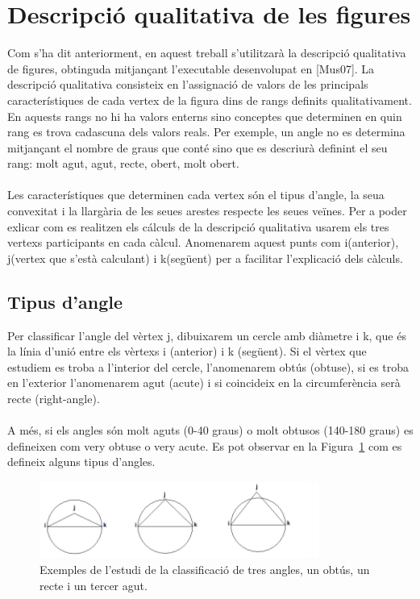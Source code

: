 \documentclass{article}
\begin{document}
\section{Descripció qualitativa de les figures}
Com s'ha dit anteriorment, en aquest treball s'utilitzarà la descripció qualitativa de figures, obtinguda mitjançant l'executable desenvolupat en [Mus07].
La descripció qualitativa consisteix en l'assignació de valors de les principals característiques de cada vertex de la figura dins de rangs definits qualitativament.
En aquests rangs no hi ha valors enterns sino conceptes que determinen en quin rang es trova cadascuna dels valors reals.
Per exemple, un angle no es determina mitjançant el nombre de graus que conté sino que es descriurà definint el seu rang: molt agut, agut, recte, obert, molt obert.
\\
\\
Les característiques que determinen cada vertex són el tipus d'angle, la seua convexitat i la llargària de les seues arestes respecte les seues veïnes.
Per a poder exlicar com es realitzen els cálculs de la descripció qualitativa usarem els tres vertexs participants en cada càlcul.
Anomenarem aquest punts com i(anterior), j(vertex que s'està calculant) i k(següent) per a facilitar l'explicació dels càlculs.
\\
\subsection{Tipus d'angle}
Per classificar l'angle del vèrtex j, dibuixarem un cercle amb diàmetre i k, que és la línia d'unió entre els vèrtexs i (anterior) i k (següent).
Si el vèrtex que estudiem es troba a l'interior del cercle, l'anomenarem obtús (obtuse), si es troba en l'exterior l’anomenarem agut (acute) i si coincideix en la circumferència serà recte (right-angle).
\\
\\
A més, si els angles són molt aguts (0-40 graus) o molt obtusos (140-180 graus) es defineixen com very obtuse o very acute.
Es pot observar en la Figura~\ref{fig:angulos} com es defineix alguns tipus d'angles.
\\

\begin{figure}[h]
\centering
\includegraphics[width=260pt]{images/angles.png}
\caption {Exemples de l'estudi de la classificació de tres angles, un obtús, un recte i un tercer agut.}
\label {fig:angulos}
\end{figure}
\end{document}
